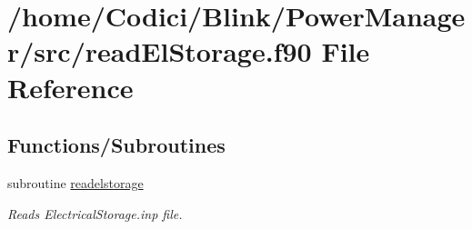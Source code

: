 \hypertarget{read_el_storage_8f90}{\section{/home/\-Codici/\-Blink/\-Power\-Manager/src/read\-El\-Storage.f90 File Reference}
\label{read_el_storage_8f90}
}
\subsection*{Functions/\-Subroutines}
\begin{DoxyCompactItemize}
\item 
subroutine \hyperlink{read_el_storage_8f90_a81103711b37b843984df33b7a8b45019}{readelstorage}
\begin{DoxyCompactList}\small\item\em Reads Electrical\-Storage.\-inp file. \end{DoxyCompactList}\end{DoxyCompactItemize}


